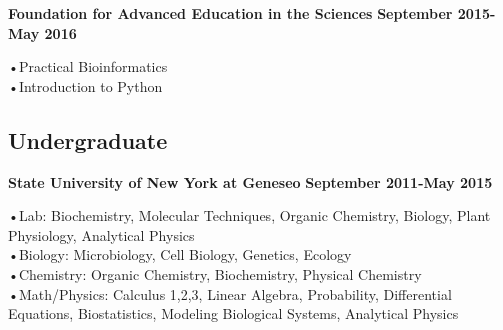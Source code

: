 \documentclass[11pt,a4paper,sans]{moderncv}        %
\begin{document}
\vspace{5pt}

\textbf{Foundation for Advanced Education in the Sciences}
\hfill
\textbf{September 2015-May 2016}

•Practical Bioinformatics\\•Introduction to Python

\vspace{5pt}

\subsection{Undergraduate}

\textbf{State University of New York at Geneseo}
\hfill
\textbf{September 2011-May 2015}

•Lab: Biochemistry, Molecular Techniques, Organic Chemistry, Biology, Plant Physiology, Analytical Physics
\\•Biology: Microbiology, Cell Biology, Genetics, Ecology
\\•Chemistry: Organic Chemistry, Biochemistry, Physical Chemistry
\\•Math/Physics: Calculus 1,2,3, Linear Algebra, Probability, Differential Equations, Biostatistics, Modeling Biological
Systems, Analytical Physics

\vspace{1pt}
\end{document}
